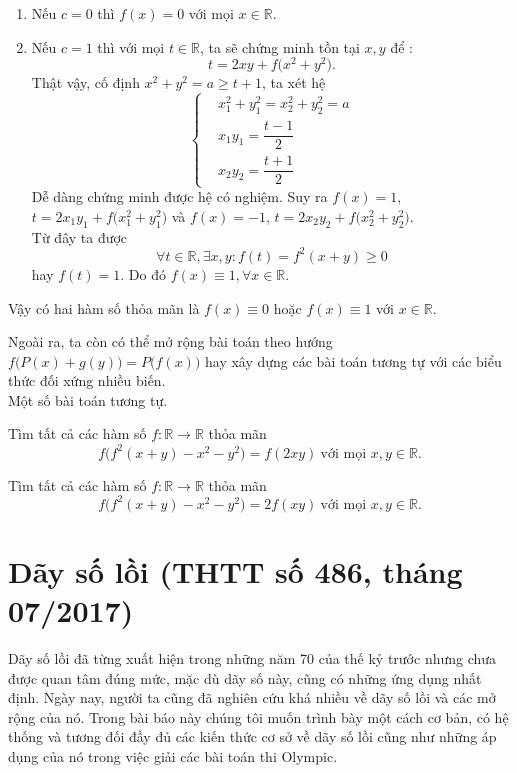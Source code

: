 \begin{bt}
{		\begin{enumerate}[1.]
			\item Nếu $c=0$ thì $f(x)=0$ với mọi $x\in\mathbb{R}$.
			\item Nếu $c=1$ thì với mọi $t\in\mathbb{R}$, ta sẽ chứng minh tồn tại $x,y$ để :
			$$t=2xy+f\bigl(x^2+y^2\bigr).$$
			Thật vậy, cố định $x^2+y^2=a\geq t+1$, ta xét hệ
			$$\left\{\begin{aligned}
			&x_1^2+y_1^2=x^2_2+y_2^2=a\\
			&x_1y_1=\dfrac{t-1}{2}\\
			&x_2y_2=\dfrac{t+1}{2}
			\end{aligned}\right.$$
			Dễ dàng chứng minh được hệ có nghiệm. Suy ra $f(x)=1$, $t=2x_1y_1+f\bigl(x_1^2+y_1^2\bigr)$ và $f(x)=-1$, $t=2x_2y_2+f\bigl(x_2^2+y_2^2\bigr)$.\\
			Từ đây ta được 
			$$\forall t\in \mathbb{R}, \exists x,y\colon f(t)=f^2(x+y)\geq 0$$
			hay $f(t)=1$. Do đó $f(x)\equiv 1,\forall x\in \mathbb{R}$.
		\end{enumerate}
		Vậy có hai hàm số thỏa mãn là $f(x)\equiv 0$ hoặc $f(x)\equiv 1$ với $x\in\mathbb{R}$.
	}
\end{bt}
Ngoài ra, ta còn có thể mở rộng bài toán theo hướng $f\bigl(P(x)+g(y)\bigr)=P\bigl(f(x)\bigr)$ hay xây dựng các bài toán tương tự với các biểu thức đối xứng nhiều biến.\\
Một số bài toán tương tự.
\begin{bt}%
	Tìm tất cả các hàm số $f\colon \mathbb{R}\to \mathbb{R}$ thỏa mãn
	$$f\bigl(f^2(x+y)-x^2-y^2\bigr)=f(2xy)\ \textrm{với mọi }x,y\in\mathbb{R}.$$
\end{bt}
\begin{bt}%
	Tìm tất cả các hàm số $f\colon \mathbb{R}\to \mathbb{R}$ thỏa mãn
	$$f\bigl(f^2(x+y)-x^2-y^2\bigr)=2f(xy)\ \textrm{với mọi } x,y\in\mathbb{R}.$$
\end{bt}


\section{Dãy số lồi (THTT số 486, tháng 07/2017)}
\begin{center}
	\textbf{\color{violet}{Kiều Đình Minh - Nguyễn Tiến Long \\ (GV THPT Chuyên Hùng Vương, Phú Thọ)}}
\end{center}
Dãy số lồi đã từng xuất hiện trong những năm 70 của thế kỷ trước nhưng chưa được quan tâm đúng mức, mặc dù dãy số này, cũng có những ứng dụng nhất định. Ngày nay, người ta cũng đã nghiên cứu khá nhiều về dãy số lồi và các mở rộng của nó. Trong bài báo này chúng tôi muốn trình bày một cách cơ bản, có hệ thống và tương đối đầy đủ các kiến thức cơ sở về dãy số lồi cũng như những áp dụng của nó trong việc giải các bài toán thi Olympic.
